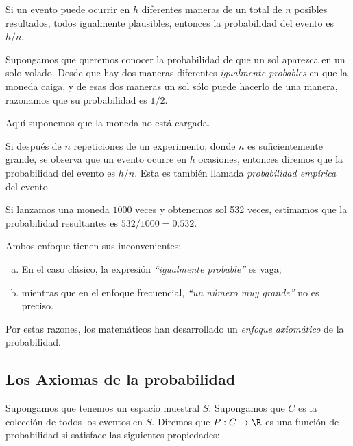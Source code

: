 Si un evento puede ocurrir en $h$ diferentes maneras de un total de $n$ posibles resultados, todos igualmente plausibles, entonces la probabilidad del evento es $h/n.$


 \begin{ejemplo}
  \label{exmp:0.1.10}
  Supongamos que queremos conocer la probabilidad de que un sol aparezca en un solo volado.  Desde que hay dos maneras diferentes \emph{igualmente probables} en que la moneda caiga,  y de esas dos maneras un sol sólo puede hacerlo de una manera, razonamos que su probabilidad es $1/2.$
    

  \begin{rem}
   Aquí suponemos que la moneda no está cargada.
  \end{rem}

 \end{ejemplo}


Si después de $n$ repeticiones de un experimento, donde $n$ es suficientemente grande, se observa que un evento ocurre en $h$ ocasiones, entonces diremos que la probabilidad del evento es $h/n.$  Esta es también llamada \emph{probabilidad empírica} del evento.


\begin{ejemplo}
 \label{exmp:0.1.11}
 Si lanzamos una moneda $1000$ veces y obtenemos sol 532 veces, estimamos que la probabilidad resultantes es $532/1000=0.532$.
\end{ejemplo}



 \begin{rem}
  Ambos enfoque tienen sus inconvenientes:
  \begin{enumerate}[(a)]
   \item En el caso clásico, la expresión \emph{``igualmente probable''} es vaga; 
   \item mientras que en el enfoque frecuencial, \emph{``un número muy grande''} no es preciso. 
  \end{enumerate}
Por estas razones, los matemáticos han desarrollado un \emph{enfoque axiomático} de la probabilidad.
 \end{rem}


\subsection{Los Axiomas de la probabilidad}

Supongamos que tenemos un espacio muestral $S.$ Supongamos que $C$ es la colección de todos los eventos en $S.$ Diremos que $P:C \to \R$ es una función de probabilidad si satisface las siguientes propiedades:

